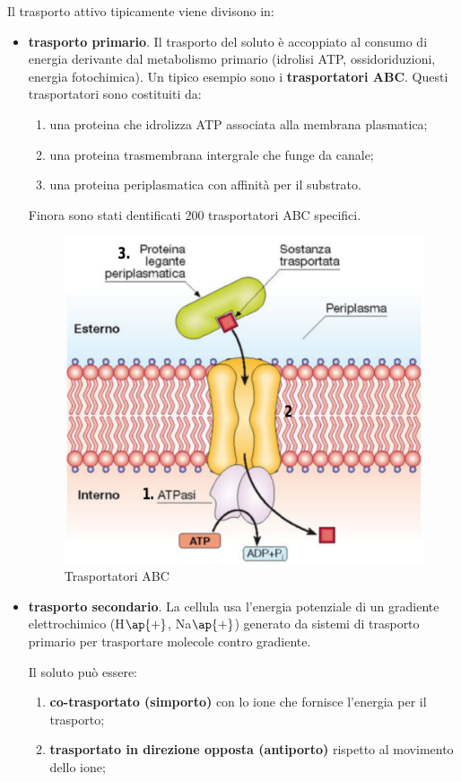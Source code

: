 \documentclass[11pt]{book}
\begin{document}
Il trasporto attivo tipicamente viene divisono in:
\begin{itemize}
\item \textbf{trasporto primario}. Il trasporto del soluto è accoppiato al consumo di energia derivante dal metabolismo primario (idrolisi ATP, ossidoriduzioni, energia fotochimica).
Un tipico esempio sono i \textbf{trasportatori ABC}. Questi trasportatori sono costituiti da:
\begin{enumerate}
\item una proteina che idrolizza ATP associata alla membrana plasmatica; 
\item una proteina trasmembrana intergrale che funge da canale;
\item una proteina periplasmatica con affinità per il substrato.
\end{enumerate}
Finora sono stati dentificati 200 trasportatori ABC specifici. 

\clearpage
\begin{figure}[htp]
\centering
\includegraphics[scale=0.4]{img/Trasportatore ABC.png}
\caption{Trasportatori ABC}
\label{}
\end{figure}

\item \textbf{trasporto secondario}. La cellula usa l'energia potenziale di un gradiente elettrochimico (H$\ap{+}$, Na$\ap{+}$) generato da sistemi di
trasporto primario per trasportare molecole contro gradiente.

Il soluto può essere:
\begin{enumerate}
\item \textbf{co-trasportato (simporto)} con lo ione che fornisce l’energia per il trasporto;
\item \textbf{trasportato in direzione opposta (antiporto)} rispetto al movimento dello ione;
\end{enumerate}


\end{itemize}
\end{document}
